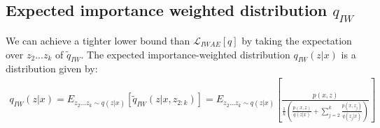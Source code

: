 \documentclass{article} %
\begin{document}











\subsection{Expected importance weighted distribution \texorpdfstring{ $q_{IW}$}{} }

We can achieve a tighter lower bound than $\mathcal{L}_{IWAE}[q]$ by taking the expectation over $z_2 ... z_k$ of $\tilde{q}_{IW}$. The expected importance-weighted distribution $q_{IW}(z|x)$ is a distribution given by:
\begin{align} 
    q_{IW}(z|x)
    = E_{z_{2}...z_{k} \sim q(z|x)} \left[ \tilde{q}_{IW}(z|x,z_{2:k}) \right] 
    = E_{z_{2}...z_{k} \sim q(z|x)} \left[ \frac{p(x,z)}{  \frac{1}{k} \left( \frac{p(x,z)}{q(z|x)}+ \sum_{j=2}^k \frac{p(x,z_j)}{q(z_j|x)} \right) } \right] \label{marg} 
\end{align}
\end{document}
